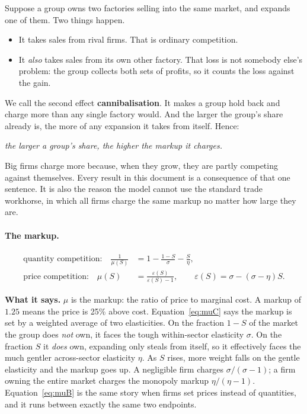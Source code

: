 \documentclass[11pt]{article}
\newenvironment{keypoint}
  {\begin{lrbox}{\kbox}\begin{minipage}{0.93\textwidth}\vspace{3pt}}
  {\vspace{3pt}\end{minipage}\end{lrbox}\begin{center}\fbox{\usebox{\kbox}}\end{center}}
\newcommand{\says}[1]{\smallskip\noindent\textbf{What it says.} #1\smallskip}
\theoremstyle{plain}
\theoremstyle{remark}
\theoremstyle{definition}
\begin{document}
Suppose a group owns two factories selling into the same market, and expands one of
them. Two things happen.

\begin{itemize}
\item It takes sales from rival firms. That is ordinary competition.
\item It \emph{also} takes sales from its own other factory. That loss is not
somebody else's problem: the group collects both sets of profits, so it counts the
loss against the gain.
\end{itemize}

\noindent We call the second effect \textbf{cannibalisation}. It makes a group hold
back and charge more than any single factory would. And the larger the group's share
already is, the more of any expansion it takes from itself. Hence:

\begin{center}
\emph{the larger a group's share, the higher the markup it charges.}
\end{center}

\begin{keypoint}
Big firms charge more because, when they grow, they are partly competing against
themselves. Every result in this document is a consequence of that one sentence. It
is also the reason the model cannot use the standard trade workhorse, in which all
firms charge the same markup no matter how large they are.
\end{keypoint}

\paragraph{The markup.}

\begin{align}
  \text{quantity competition:}\quad  \frac{1}{\mu(S)} &= 1 - \frac{1-S}{\sigma} - \frac{S}{\eta},
  \label{eq:muC}\\[4pt]
  \text{price competition:}\quad \mu(S) &= \frac{\varepsilon(S)}{\varepsilon(S)-1},
  \qquad \varepsilon(S)=\sigma-(\sigma-\eta)S .
  \label{eq:muB}
\end{align}

\says{$\mu$ is the markup: the ratio of price to marginal cost. A markup of $1.25$
means the price is 25\% above cost. Equation~\eqref{eq:muC} says the markup is set by
a weighted average of two elasticities. On the fraction $1-S$ of the market the group
does \emph{not} own, it faces the tough within-sector elasticity $\sigma$. On the
fraction $S$ it \emph{does} own, expanding only steals from itself, so it effectively
faces the much gentler across-sector elasticity $\eta$. As $S$ rises, more weight
falls on the gentle elasticity and the markup goes up. A negligible firm charges
$\sigma/(\sigma-1)$; a firm owning the entire market charges the monopoly markup
$\eta/(\eta-1)$. Equation~\eqref{eq:muB} is the same story when firms set prices
instead of quantities, and it runs between exactly the same two endpoints.}
\end{document}
